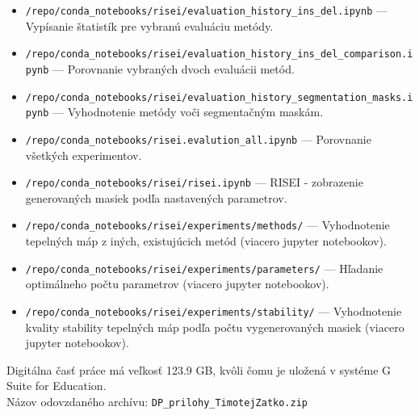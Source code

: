 \begin{itemize}
    \item \texttt{/repo/conda\_notebooks/risei/evaluation\_history\_ins\_del\-.ipynb} --- Vypísanie štatistík pre vybranú evaluáciu metódy.
    \item \texttt{/repo/conda\_notebooks/risei/evaluation\_history\_ins\_del\-\_comparison\-.ipynb} --- Porovnanie vybraných dvoch evaluácii metód.
    \item \texttt{/repo/conda\_notebooks/risei/evaluation\_history\_\-segmentation\-\_masks\-.ipynb} --- Vyhodnotenie metódy voči segmentačným maskám.
    \item \texttt{/repo/conda\_notebooks/risei.evalution\_all.ipynb} --- Porovnanie všetkých experimentov.
    \item \texttt{/repo/conda\_notebooks/risei/risei.ipynb} --- RISEI - zobrazenie generovaných masiek podľa nastavených parametrov.
    \item \texttt{/repo/conda\_notebooks/risei/experiments/methods/} --- Vyhodnotenie tepelných máp z iných, existujúcich metód (viacero jupyter notebookov).
    \item \texttt{/repo/conda\_notebooks/risei/experiments/parameters/} --- Hľadanie optimálneho počtu parametrov (viacero jupyter notebookov).
    \item \texttt{/repo/conda\_notebooks/risei/experiments/stability/} --- Vyhodnotenie kvality stability tepelných máp podľa počtu vygenerovaných masiek (viacero jupyter notebookov).
\end{itemize}

Digitálna časť práce má veľkosť 123.9 GB, kvôli čomu je uložená v systéme G Suite for
Education. \\
Názov odovzdaného archívu: \texttt{DP\_prilohy\_TimotejZatko.zip}
